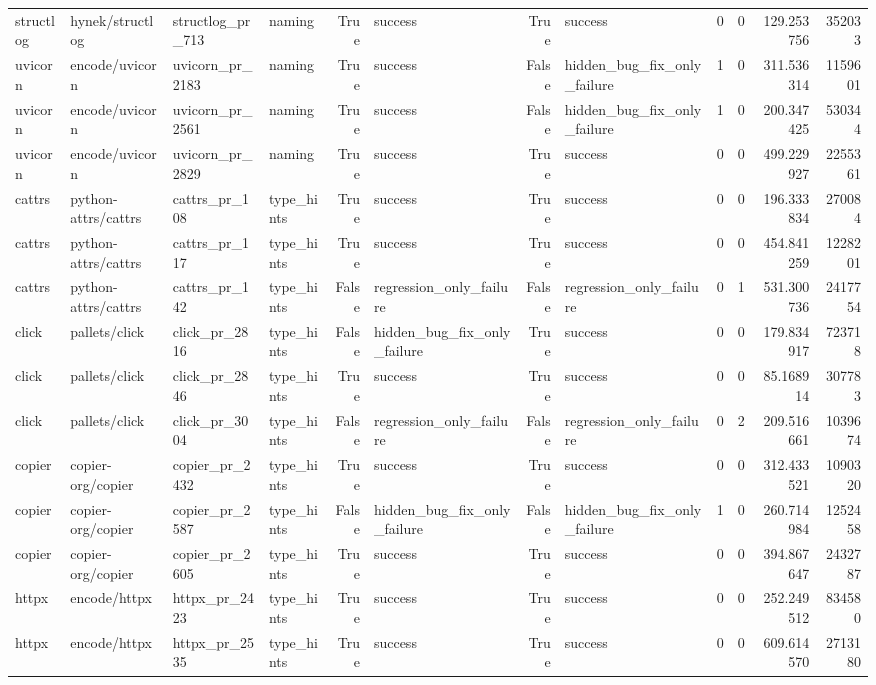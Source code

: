 \begin{tabular}{llllrlrlrrrr}
structlog & hynek/structlog & structlog\_pr\_713 & naming & True & success & True & success & 0 & 0 & 129.253756 & 352033 \\
uvicorn & encode/uvicorn & uvicorn\_pr\_2183 & naming & True & success & False & hidden\_bug\_fix\_only\_failure & 1 & 0 & 311.536314 & 1159601 \\
uvicorn & encode/uvicorn & uvicorn\_pr\_2561 & naming & True & success & False & hidden\_bug\_fix\_only\_failure & 1 & 0 & 200.347425 & 530344 \\
uvicorn & encode/uvicorn & uvicorn\_pr\_2829 & naming & True & success & True & success & 0 & 0 & 499.229927 & 2255361 \\
cattrs & python-attrs/cattrs & cattrs\_pr\_108 & type\_hints & True & success & True & success & 0 & 0 & 196.333834 & 270084 \\
cattrs & python-attrs/cattrs & cattrs\_pr\_117 & type\_hints & True & success & True & success & 0 & 0 & 454.841259 & 1228201 \\
cattrs & python-attrs/cattrs & cattrs\_pr\_142 & type\_hints & False & regression\_only\_failure & False & regression\_only\_failure & 0 & 1 & 531.300736 & 2417754 \\
click & pallets/click & click\_pr\_2816 & type\_hints & False & hidden\_bug\_fix\_only\_failure & True & success & 0 & 0 & 179.834917 & 723718 \\
click & pallets/click & click\_pr\_2846 & type\_hints & True & success & True & success & 0 & 0 & 85.168914 & 307783 \\
click & pallets/click & click\_pr\_3004 & type\_hints & False & regression\_only\_failure & False & regression\_only\_failure & 0 & 2 & 209.516661 & 1039674 \\
copier & copier-org/copier & copier\_pr\_2432 & type\_hints & True & success & True & success & 0 & 0 & 312.433521 & 1090320 \\
copier & copier-org/copier & copier\_pr\_2587 & type\_hints & False & hidden\_bug\_fix\_only\_failure & False & hidden\_bug\_fix\_only\_failure & 1 & 0 & 260.714984 & 1252458 \\
copier & copier-org/copier & copier\_pr\_2605 & type\_hints & True & success & True & success & 0 & 0 & 394.867647 & 2432787 \\
httpx & encode/httpx & httpx\_pr\_2423 & type\_hints & True & success & True & success & 0 & 0 & 252.249512 & 834580 \\
httpx & encode/httpx & httpx\_pr\_2535 & type\_hints & True & success & True & success & 0 & 0 & 609.614570 & 2713180 \\

\end{tabular}
